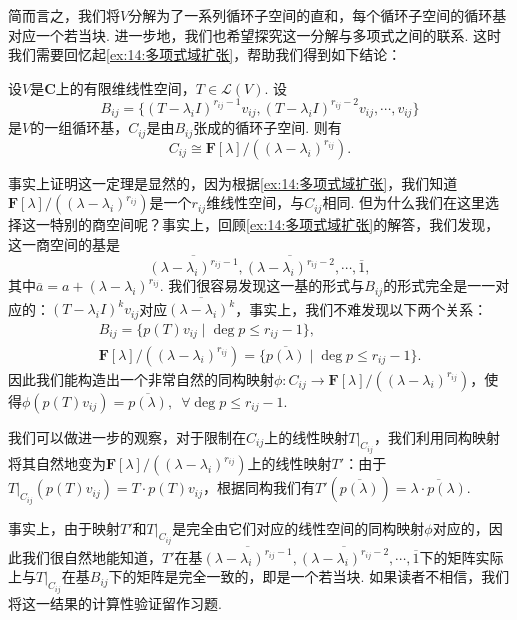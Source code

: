 简而言之，我们将$V$分解为了一系列循环子空间的直和，每个循环子空间的循环基对应一个若当块. 进一步地，我们也希望探究这一分解与多项式之间的联系. 这时我们需要回忆起\autoref{ex:14:多项式域扩张}，帮助我们得到如下结论：
\begin{theorem} \label{thm:19:循环子空间同构于商空间}
    设$V$是$\mathbf{C}$上的有限维线性空间，$T\in\mathcal{L}(V)$. 设
    \[B_{ij}=\{(T-\lambda_iI)^{r_{ij}-1}v_{ij},(T-\lambda_iI)^{r_{ij}-2}v_{ij},\cdots,v_{ij}\}\]
    是$V$的一组循环基，$C_{ij}$是由$B_{ij}$张成的循环子空间. 则有
    \[C_{ij}\cong \mathbf{F}[\lambda]/((\lambda-\lambda_i)^{r_{ij}}).\]
\end{theorem}

事实上证明这一定理是显然的，因为根据\autoref{ex:14:多项式域扩张}，我们知道$\mathbf{F}[\lambda]/((\lambda-\lambda_i)^{r_{ij}})$是一个$r_{ij}$维线性空间，与$C_{ij}$相同. 但为什么我们在这里选择这一特别的商空间呢？事实上，回顾\autoref{ex:14:多项式域扩张}的解答，我们发现，这一商空间的基是
\[\overline{(\lambda-\lambda_i)^{r_{ij}-1}},\overline{(\lambda-\lambda_i)^{r_{ij}-2}},\cdots,\overline{1},\]
其中$\overline{a}=a+(\lambda-\lambda_i)^{r_{ij}}$. 我们很容易发现这一基的形式与$B_{ij}$的形式完全是一一对应的：$(T-\lambda_iI)^kv_{ij}$对应$\overline{(\lambda-\lambda_i)^k}$，事实上，我们不难发现以下两个关系：
\begin{gather*}
    B_{ij}=\{p(T)v_{ij}\mid \deg p\leqslant r_{ij}-1\},\\
    \mathbf{F}[\lambda]/((\lambda-\lambda_i)^{r_{ij}})=\{\overline{p(\lambda)}\mid \deg p\leqslant r_{ij}-1\}.
\end{gather*}
因此我们能构造出一个非常自然的同构映射$\phi:C_{ij}\to \mathbf{F}[\lambda]/((\lambda-\lambda_i)^{r_{ij}})$，使得$\phi(p(T)v_{ij})=\overline{p(\lambda)},\enspace\forall \deg p\leqslant r_{ij}-1$.

我们可以做进一步的观察，对于限制在$C_{ij}$上的线性映射$T|_{C_{ij}}$，我们利用同构映射将其自然地变为$\mathbf{F}[\lambda]/((\lambda-\lambda_i)^{r_{ij}})$上的线性映射$T'$：由于$T|_{C_{ij}}(p(T)v_{ij})=T\cdot p(T)v_{ij}$，根据同构我们有$T'(\overline{p(\lambda)})=\overline{\lambda\cdot p(\lambda)}$.

事实上，由于映射$T'$和$T|_{C_{ij}}$是完全由它们对应的线性空间的同构映射$\phi$对应的，因此我们很自然地能知道，$T'$在基$\overline{(\lambda-\lambda_i)^{r_{ij}-1}},\overline{(\lambda-\lambda_i)^{r_{ij}-2}},\cdots,\overline{1}$下的矩阵实际上与$T|_{C_{ij}}$在基$B_{ij}$下的矩阵是完全一致的，即是一个若当块. 如果读者不相信，我们将这一结果的计算性验证留作习题.

